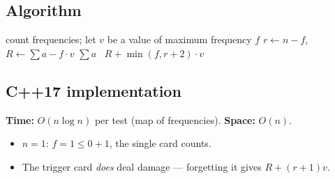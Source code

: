 \subsection*{Algorithm}
\begin{algorithmic}[1]
\State count frequencies; let $v$ be a value of maximum frequency $f$
\State $r\gets n-f$, $R\gets \sum a - f\cdot v$
 \Return $\sum a$
\Else \ \Return $R+\min(f,r+2)\cdot v$
\EndIf
\end{algorithmic}


\subsection*{C++17 implementation}

\begin{complexitybox}
\textbf{Time:} $O(n\log n)$ per test (map of frequencies).
\textbf{Space:} $O(n)$.
\end{complexitybox}

\begin{pitfallbox}
\begin{itemize}
  \item $n=1$: $f=1\le 0+1$, the single card counts.
  \item The trigger card \emph{does} deal damage --- forgetting it gives
        $R+(r+1)v$.
\end{itemize}
\end{pitfallbox}
